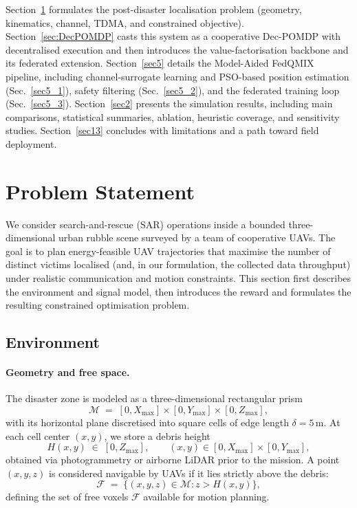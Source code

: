 \documentclass[drones,article,accept,pdftex,moreauthors]{Definitions/mdpi}
\begin{document}
Section~\ref{sec:sysmodel} formulates the post-disaster localisation problem
(geometry, kinematics, channel, TDMA, and constrained objective).
Section~\ref{sec:DecPOMDP} casts this system as a cooperative Dec-POMDP with
decentralised execution and then introduces the value-factorisation backbone and
its federated extension. Section~\ref{sec5} details the Model-Aided
FedQMIX pipeline, including channel-surrogate learning and PSO-based position
estimation (Sec.~\ref{sec5_1}), safety filtering (Sec.~\ref{sec5_2}), and the
federated training loop (Sec.~\ref{sec5_3}). Section~\ref{sec2} presents the
simulation results, including main comparisons, statistical summaries, ablation,
heuristic coverage, and sensitivity studies. Section~\ref{sec13} concludes with
limitations and a path toward field deployment.





\section{Problem Statement}\label{sec:sysmodel}

We consider search-and-rescue (SAR) operations inside a bounded three-dimensional
urban rubble scene surveyed by a team of cooperative UAVs. The goal is to plan
energy-feasible UAV trajectories that maximise the number of distinct victims
localised (and, in our formulation, the collected data throughput) under realistic
communication and motion constraints. This section first describes the environment
and signal model, then introduces the reward and formulates the resulting constrained
optimisation problem.

\subsection{Environment}\label{sec:env}

\paragraph{Geometry and free space.}
The disaster zone is modeled as a three-dimensional rectangular prism
\begin{equation}
\mathcal M \;=\;[0,X_{\max}]\times[0,Y_{\max}]\times[0,Z_{\max}],
\end{equation}
with its horizontal plane discretised into square cells of edge length
$\delta = 5\,\mathrm{m}$. At each cell center $(x,y)$, we store a debris height
\begin{equation}
H(x,y)\;\in\;[0,Z_{\max}], \qquad
(x,y)\in[0,X_{\max}]\times[0,Y_{\max}],
\label{eq:height}
\end{equation}
obtained via photogrammetry or airborne LiDAR prior to the mission.
A point $(x,y,z)$ is considered navigable by UAVs if it lies strictly above the debris:
\begin{equation}
\mathcal F \;=\;\bigl\{(x,y,z)\in\mathcal M : z > H(x,y)\bigr\},
\label{eq:freevox}
\end{equation}
defining the set of free voxels \(\mathcal F\) available for motion planning.
\end{document}
